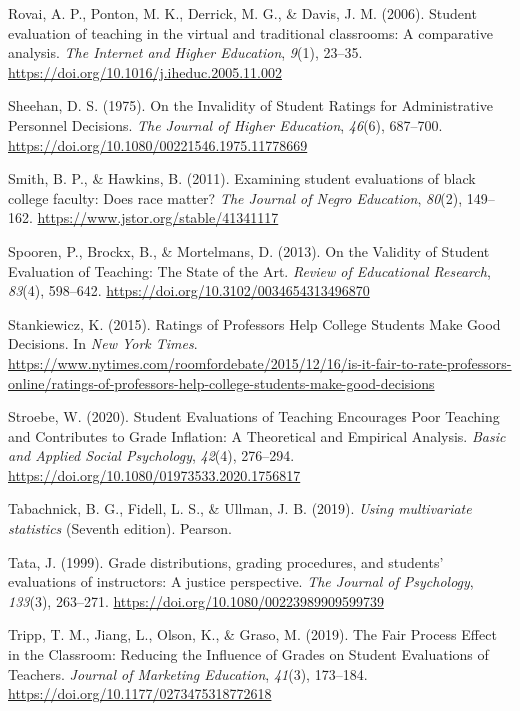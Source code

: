 \documentclass[
  man]{apa7}
\newlength{\cslhangindent}
\newenvironment{CSLReferences}[2] %
 {\begin{list}{}{%
  \setlength{\itemindent}{0pt}
  \setlength{\leftmargin}{0pt}
  \setlength{\parsep}{0pt}
  \ifodd #1
   \setlength{\leftmargin}{\cslhangindent}
   \setlength{\itemindent}{-1\cslhangindent}
  \fi
  \setlength{\itemsep}{#2\baselineskip}}}
 {\end{list}}
\begin{document}
\begin{CSLReferences}{1}{0}
Rovai, A. P., Ponton, M. K., Derrick, M. G., \& Davis, J. M. (2006). Student evaluation of teaching in the virtual and traditional classrooms: A comparative analysis. \emph{The Internet and Higher Education}, \emph{9}(1), 23--35. \url{https://doi.org/10.1016/j.iheduc.2005.11.002}

Sheehan, D. S. (1975). On the Invalidity of Student Ratings for Administrative Personnel Decisions. \emph{The Journal of Higher Education}, \emph{46}(6), 687--700. \url{https://doi.org/10.1080/00221546.1975.11778669}

Smith, B. P., \& Hawkins, B. (2011). Examining student evaluations of black college faculty: Does race matter? \emph{The Journal of Negro Education}, \emph{80}(2), 149--162. \url{https://www.jstor.org/stable/41341117}

Spooren, P., Brockx, B., \& Mortelmans, D. (2013). On the Validity of Student Evaluation of Teaching: The State of the Art. \emph{Review of Educational Research}, \emph{83}(4), 598--642. \url{https://doi.org/10.3102/0034654313496870}

Stankiewicz, K. (2015). Ratings of {Professors} {Help} {College} {Students} {Make} {Good} {Decisions}. In \emph{New York Times}. \url{https://www.nytimes.com/roomfordebate/2015/12/16/is-it-fair-to-rate-professors-online/ratings-of-professors-help-college-students-make-good-decisions}

Stroebe, W. (2020). Student Evaluations of Teaching Encourages Poor Teaching and Contributes to Grade Inflation: A Theoretical and Empirical Analysis. \emph{Basic and Applied Social Psychology}, \emph{42}(4), 276--294. \url{https://doi.org/10.1080/01973533.2020.1756817}

Tabachnick, B. G., Fidell, L. S., \& Ullman, J. B. (2019). \emph{Using multivariate statistics} (Seventh edition). Pearson.

Tata, J. (1999). Grade distributions, grading procedures, and students' evaluations of instructors: A justice perspective. \emph{The Journal of Psychology}, \emph{133}(3), 263--271. \url{https://doi.org/10.1080/00223989909599739}

Tripp, T. M., Jiang, L., Olson, K., \& Graso, M. (2019). The Fair Process Effect in the Classroom: Reducing the Influence of Grades on Student Evaluations of Teachers. \emph{Journal of Marketing Education}, \emph{41}(3), 173--184. \url{https://doi.org/10.1177/0273475318772618}


\end{CSLReferences}
\end{document}
